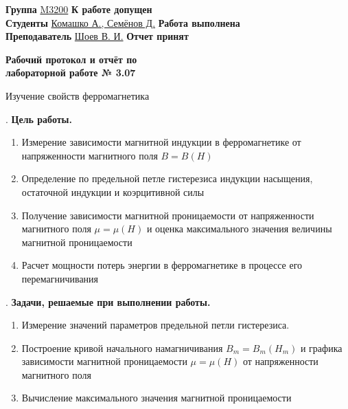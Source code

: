 \documentclass[12pt]{article}
\begin{document}
    \vspace*{2\baselineskip}

    \thispagestyle{fancy}

    \noindent
    \textbf{Группа} \underline{M3200\hspace{4.5cm}} \hfill \textbf{К работе допущен} \underline{\hspace{4cm}} \\[0.5cm]
    \textbf{Студенты} \underline{Комашко А., Семёнов Д.\hspace{0.45cm}} \hfill \textbf{Работа выполнена} \underline{\hspace{4cm}} \\[0.5cm]
    \textbf{Преподаватель} \underline{Шоев В. И.\hspace{1.9cm}} \hfill \textbf{Отчет принят} \underline{\hspace{4.85cm}} \\



    \begin{center}
    {\huge \textbf{Рабочий протокол и отчёт по\\ лабораторной работе № 3.07}}

        \smallvspace

        {\Large Изучение свойств ферромагнетика}
    \end{center}


    . \textbf{Цель работы.}

    \begin{enumerate}
        \item Измерение зависимости магнитной индукции в ферромагнетике от напряженности магнитного поля $B = B(H)$
        \item Определение по предельной петле гистерезиса индукции насыщения, остаточной индукции и коэрцитивной силы
        \item Получение зависимости магнитной проницаемости от напряженности магнитного поля $\mu = \mu(H)$ и оценка максимального значения величины магнитной проницаемости
        \item Расчет мощности потерь энергии в ферромагнетике в процессе его перемагничивания
    \end{enumerate}

    \mediumvspace

    . \textbf{Задачи, решаемые при выполнении работы.}

    \begin{enumerate} 
        \item Измерение значений параметров предельной петли гистерезиса.
        \item Построение кривой начального намагничивания $B_m = B_m(H_m)$ и графика зависимости магнитной проницаемости $\mu = \mu(H)$ от напряженности магнитного поля
        \item Вычисление максимального значения магнитной проницаемости
    \end{enumerate}
\end{document}
